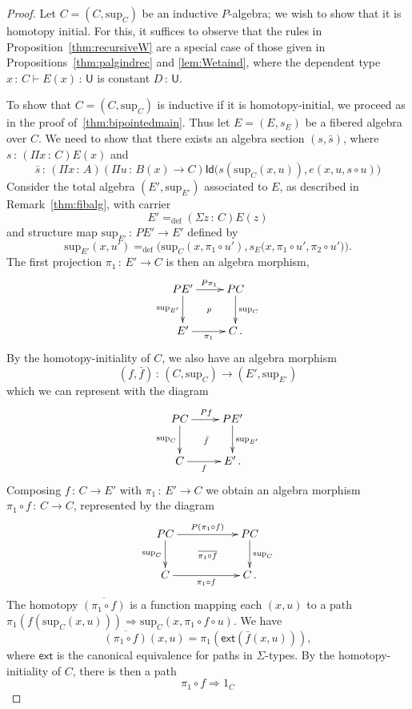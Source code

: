 \documentclass[10pt,a4paper,oneside,reqno]{amsart}
\numberwithin{equation}{section}
\theoremstyle{mythm}
\theoremstyle{mydef}
\theoremstyle{myrmk}
\newcommand{\defeq}{=_{\mathrm{def}}}
\newcommand{\co}{\,{:}\,}
\newcommand{\com}{\circ}
\newcommand{\ext}{\mathsf{ext}}
\newcommand{\idtodpair}{\ext}
\newcommand{\Id}{\mathsf{Id}}
\newcommand{\U}{\mathsf{U}}
\renewcommand{\sup}{\mathrm{sup}}
\begin{document}
\begin{proof}
Let $C = (C, \sup_C)$ be an inductive $P$-algebra; we wish to show that it is homotopy initial.
For this, it suffices to observe that the rules in Proposition~\ref{thm:recursiveW} are a special case of those given in Propositions~\ref{thm:palgindrec} and \ref{lem:Wetaind}, where the dependent type $x \co C \vdash E(x) \co \U$ is constant $D \co \U$.

To show that $C = (C, \sup_C)$ is inductive if it is homotopy-initial, we proceed as in the proof of~\ref{thm:bipointedmain}. 
Thus let $E = (E, s_E)$ be a fibered algebra over $C$. We need to show that there
exists an algebra section $(s, \bar{s})$, where $s \co (\Pi x \co C) E(x)$ and 
\[ 
\bar{s} \co (\Pi x \co A)(\Pi u \co B(x) \to C) \Id \big( s(\sup_C(x,u)), e(x, u, s \circ u) \big)
\]
%
Consider the total algebra $(E', \sup_{E'})$ associated to $E$, as described in Remark~\ref{thm:fibalg}, with carrier 
\[
E' \defeq (\Sigma z \co C) E(z) 
\]
and structure map $\sup_{E'} \co PE' \to E'$ defined by
\[
\sup_{E'}(x,u') \defeq \Big(\sup_C(x,\pi_1 \circ u'), s_E\big(x,\pi_1 \circ u', \pi_2 \circ u'\big)\Big) .
\]
The first projection $\pi_1 \co E' \to C$ is then an algebra morphism,
\[
\xymatrix{
PE' \ar[r]^{P\pi_1} \ar[d]_-{\sup_{E'}} \ar@{}[rd]|{p} & PC \ar[d]^{\sup_C} \\ 
E'  \ar[r]_-{\pi_1} & C \, .}
 \]
%
By the homotopy-initiality of $C$, we also have an algebra morphism 
\[
(f, \bar{f}) \co (C, \sup_C)  \to (E', \sup_{E'}) 
\]
which we can represent with the diagram
\[
\xymatrix{
PC \ar[r]^{Pf} \ar[d]_-{\sup_{C}} \ar@{}[rd]|{\bar{f}} & PE' \ar[d]^{\sup_{E'}} \\ 
C  \ar[r]_-{f} & E' \, .}
 \]
%
Composing $f \co C \to E'$ with $\pi_1 \co E' \to C$ we obtain an algebra morphism $\pi_1 \com f \co C \to C$, represented by the diagram
\[
\xymatrix{
PC \ar[rr]^{P(\pi_1 \com f)} \ar[d]_-{\sup_{C}} \ar@{}[rrd]|{\overline{\pi_1 \com f}} && PC \ar[d]^{\sup_{C}} \\ 
C  \ar[rr]_-{\pi_1 \com f} && C \, .}
 \]
%
The homotopy $\overline{(\pi_1 \com f)}$ is a function mapping each $(x,u)$ to
a path $\pi_1(f(\sup_C(x,u))) \Rightarrow \sup_C(x, \pi_1 \circ f \circ u)$. We have
\[
\overline{(\pi_1 \com f)}(x,u) = \pi_1(\idtodpair(\bar{f}(x,u))) ,
\]
where $\idtodpair$ is the canonical equivalence for paths in $\Sigma$-types. 
By the homotopy-initiality of $C$,  there is then a path
\begin{equation*}
\pi_1 \circ f \Rightarrow 1_C 
\end{equation*}

\end{proof}
\end{document}
